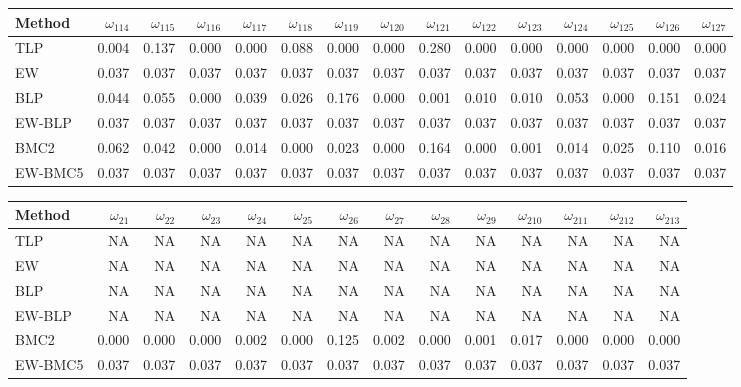 \documentclass[
]{article}
\begin{document}
\begin{tabular}{lrrrrrrrrrrrrrr}
\toprule
Method & $\omega_{114}$ & $\omega_{115}$ & $\omega_{116}$ & $\omega_{117}$ & $\omega_{118}$ & $\omega_{119}$ & $\omega_{120}$ & $\omega_{121}$ & $\omega_{122}$ & $\omega_{123}$ & $\omega_{124}$ & $\omega_{125}$ & $\omega_{126}$ & $\omega_{127}$\\
\midrule
TLP & 0.004 & 0.137 & 0.000 & 0.000 & 0.088 & 0.000 & 0.000 & 0.280 & 0.000 & 0.000 & 0.000 & 0.000 & 0.000 & 0.000\\
EW & 0.037 & 0.037 & 0.037 & 0.037 & 0.037 & 0.037 & 0.037 & 0.037 & 0.037 & 0.037 & 0.037 & 0.037 & 0.037 & 0.037\\
BLP & 0.044 & 0.055 & 0.000 & 0.039 & 0.026 & 0.176 & 0.000 & 0.001 & 0.010 & 0.010 & 0.053 & 0.000 & 0.151 & 0.024\\
EW-BLP & 0.037 & 0.037 & 0.037 & 0.037 & 0.037 & 0.037 & 0.037 & 0.037 & 0.037 & 0.037 & 0.037 & 0.037 & 0.037 & 0.037\\
BMC2 & 0.062 & 0.042 & 0.000 & 0.014 & 0.000 & 0.023 & 0.000 & 0.164 & 0.000 & 0.001 & 0.014 & 0.025 & 0.110 & 0.016\\
EW-BMC5 & 0.037 & 0.037 & 0.037 & 0.037 & 0.037 & 0.037 & 0.037 & 0.037 & 0.037 & 0.037 & 0.037 & 0.037 & 0.037 & 0.037\\
\bottomrule
\end{tabular}

\begin{tabular}{lrrrrrrrrrrrrr}
\toprule
Method & $\omega_{21}$ & $\omega_{22}$ & $\omega_{23}$ & $\omega_{24}$ & $\omega_{25}$ & $\omega_{26}$ & $\omega_{27}$ & $\omega_{28}$ & $\omega_{29}$ & $\omega_{210}$ & $\omega_{211}$ & $\omega_{212}$ & $\omega_{213}$\\
\midrule
TLP & NA & NA & NA & NA & NA & NA & NA & NA & NA & NA & NA & NA & NA\\
EW & NA & NA & NA & NA & NA & NA & NA & NA & NA & NA & NA & NA & NA\\
BLP & NA & NA & NA & NA & NA & NA & NA & NA & NA & NA & NA & NA & NA\\
EW-BLP & NA & NA & NA & NA & NA & NA & NA & NA & NA & NA & NA & NA & NA\\
BMC2 & 0.000 & 0.000 & 0.000 & 0.002 & 0.000 & 0.125 & 0.002 & 0.000 & 0.001 & 0.017 & 0.000 & 0.000 & 0.000\\
EW-BMC5 & 0.037 & 0.037 & 0.037 & 0.037 & 0.037 & 0.037 & 0.037 & 0.037 & 0.037 & 0.037 & 0.037 & 0.037 & 0.037\\
\bottomrule
\end{tabular}
\end{document}
